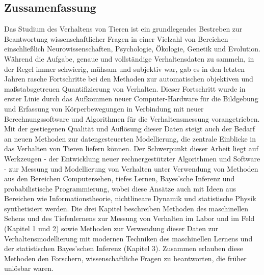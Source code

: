 \documentclass[11pt,a4paper,twoside]{book}
\begin{document}
\begin{doublespace}
	\chapter*{Zussamenfassung}
  Das Studium des Verhaltens von Tieren ist ein grundlegendes Bestreben zur Beantwortung wissenschaftlicher Fragen in einer Vielzahl von Bereichen --- einschließlich Neurowissenschaften, Psychologie, Ökologie, Genetik und Evolution. Während die Aufgabe, genaue und vollständige Verhaltensdaten zu sammeln, in der Regel immer schwierig, mühsam und subjektiv war, gab es in den letzten Jahren rasche Fortschritte bei den Methoden zur automatischen objektiven und maßstabsgetreuen Quantifizierung von Verhalten. Dieser Fortschritt wurde in erster Linie durch das Aufkommen neuer Computer-Hardware für die Bildgebung und Erfassung von Körperbewegungen in Verbindung mit neuer Berechnungssoftware und Algorithmen für die Verhaltensmessung vorangetrieben. Mit der gestiegenen Qualität und Auflösung dieser Daten steigt auch der Bedarf an neuen Methoden zur datengesteuerten Modellierung, die zentrale Einblicke in das Verhalten von Tieren liefern können. Der Schwerpunkt dieser Arbeit liegt auf Werkzeugen - der Entwicklung neuer rechnergestützter Algorithmen und Software - zur Messung und Modellierung von Verhalten unter Verwendung von Methoden aus den Bereichen Computersehen, tiefes Lernen, Bayes'sche Inferenz und probabilistische Programmierung, wobei diese Ansätze auch mit Ideen aus Bereichen wie Informationstheorie, nichtlineare Dynamik und statistische Physik synthetisiert werden. Die drei Kapitel beschreiben Methoden des maschinellen Sehens und des Tiefenlernens zur Messung von Verhalten im Labor und im Feld (Kapitel 1 und 2) sowie Methoden zur Verwendung dieser Daten zur Verhaltensmodellierung mit modernen Techniken des maschinellen Lernens und der statistischen Bayes'schen Inferenz (Kapitel 3). Zusammen erlauben diese Methoden den Forschern, wissenschaftliche Fragen zu beantworten, die früher unlösbar waren.

	\newpage

\end{doublespace}
\end{document}
